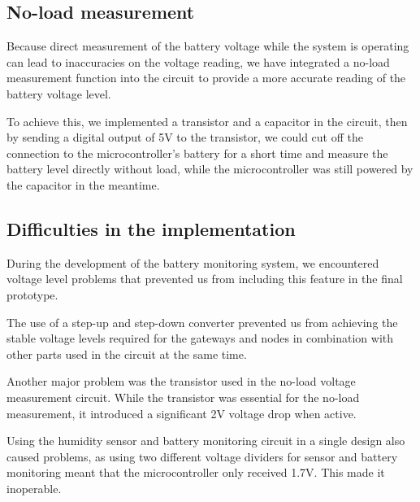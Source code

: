 \subsection{No-load measurement}

Because direct measurement of the battery voltage while the system is operating can lead to inaccuracies on the voltage reading, we have integrated a no-load measurement function into the circuit to provide a more accurate reading of the battery voltage level.

To achieve this, we implemented a transistor and a capacitor in the circuit, then by sending a digital output of 5V to the transistor, we could cut off the connection to the microcontroller's battery for a short time and measure the battery level directly without load, while the microcontroller was still powered by the capacitor in the meantime.

\subsection{Difficulties in the implementation}

During the development of the battery monitoring system, we encountered voltage level problems that prevented us from including this feature in the final prototype. 

The use of a step-up and step-down converter prevented us from achieving the stable voltage levels required for the gateways and nodes in combination with other parts used in the circuit at the same time.

Another major problem was the transistor used in the no-load voltage measurement circuit. While the transistor was essential for the no-load measurement, it introduced a significant 2V voltage drop when active.

Using the humidity sensor and battery monitoring circuit in a single design also caused problems, as using two different voltage dividers for sensor and battery monitoring meant that the microcontroller only received 1.7V. This made it inoperable.

